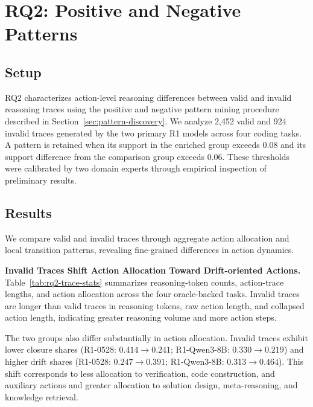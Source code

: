 \documentclass[acmsmall,screen,review,anonymous]{acmart}
\begin{document}
\section{RQ2: Positive and Negative Patterns}
\label{sec:rq2}

\subsection{Setup}
RQ2 characterizes action-level reasoning differences between valid and invalid reasoning traces using the positive and negative pattern mining procedure described in Section~\ref{sec:pattern-discovery}. We analyze 2{,}452 valid and 924 invalid traces generated by the two primary R1 models across four coding tasks. A pattern is retained when its support in the enriched group exceeds 0.08 and its support difference from the comparison group exceeds 0.06. These thresholds were calibrated by two domain experts through empirical inspection of preliminary results. %

\subsection{Results}

We compare valid and invalid traces through aggregate action allocation and local transition patterns, revealing fine-grained differences in action dynamics.



\textbf{Invalid Traces Shift Action Allocation Toward Drift-oriented Actions.}
Table~\ref{tab:rq2-trace-stats} summarizes reasoning-token counts, action-trace lengths, and action allocation across the four oracle-backed tasks. Invalid traces are longer than valid traces in reasoning tokens, raw action length, and collapsed action length, indicating greater reasoning volume and more action steps.

The two groups also differ substantially in action allocation. Invalid traces exhibit lower closure shares (R1-0528: \(0.414 \rightarrow 0.241\); R1-Qwen3-8B: \(0.330 \rightarrow 0.219\)) and higher drift shares (R1-0528: \(0.247 \rightarrow 0.391\); R1-Qwen3-8B: \(0.313 \rightarrow 0.464\)). This shift corresponds to less allocation to verification, code construction, and auxiliary actions and greater allocation to solution design, meta-reasoning, and knowledge retrieval.
\end{document}
